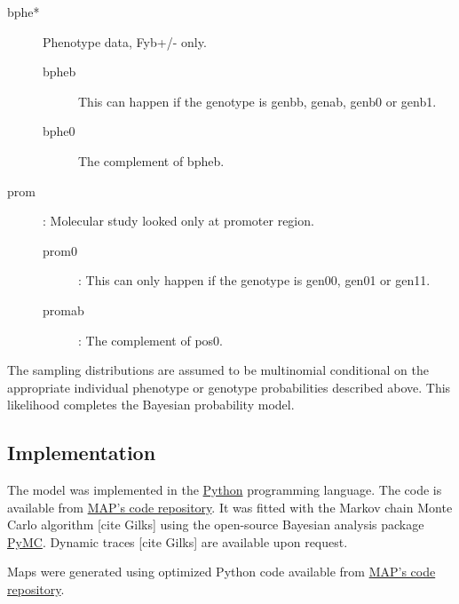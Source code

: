 \documentclass[a4paper]{article}
\begin{document}
\begin{description}
\begin{description}
    \end{description}
    \item[bphe*] Phenotype data, Fyb+/- only.
    \begin{description}
        \item[bpheb] This can happen if the genotype is genbb, genab, genb0 or genb1.
        \item[bphe0] The complement of bpheb. 
    \end{description}
    \item[prom]: Molecular study looked only at promoter region.
    \begin{description}
        \item[prom0]: This can only happen if the genotype is gen00, gen01 or gen11.
        \item[promab]: The complement of pos0.
    \end{description}
\end{description}

The sampling distributions are assumed to be multinomial conditional on the appropriate individual phenotype or genotype probabilities described above. This likelihood completes the Bayesian probability model.

\subsection{Implementation} 
The model was implemented in the \href{www.python.org}{Python} programming language. The code is available from \href{github.com/malaria-atlas-project/ibd-world}{MAP's code repository}. It was fitted with the Markov chain Monte Carlo algorithm [cite Gilks] using the open-source Bayesian analysis package \href{code.google.com/p/pymc}{PyMC}. Dynamic traces [cite Gilks] are available upon request.

Maps were generated using optimized Python code available from \href{github.com/malaria-atlas-project/generic-mbg}{MAP's code repository}.
\end{document}

